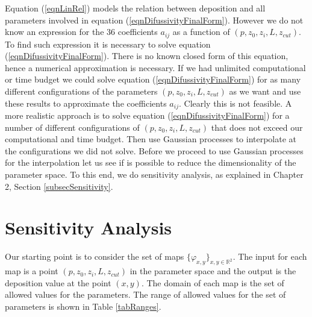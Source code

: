 \documentclass[12pt]{book}
\begin{document}
Equation (\ref{eqnLinRel}) models the relation between deposition and all
parameters involved in equation (\ref{eqnDifussivityFinalForm}). However we do not 
know an expression for the 36 coefficients $a_{ij}$ as a function of
$(p,z_{0},z_{i},L,z_{cut})$. To find such expression it is necessary
to solve equation (\ref{eqnDifussivityFinalForm}). There is no known closed
form of this equation, hence a numerical approximation is necessary. If we
had unlimited computational or time budget we could solve equation 
(\ref{eqnDifussivityFinalForm}) for as many different configurations
of the parameters $(p,z_{0},z_{i},L,z_{cut})$ as we want and use these
results to approximate the coefficients $a_{ij}$. Clearly this 
is not feasible. A more realistic approach is to solve equation (\ref{eqnDifussivityFinalForm})
for a number of different configurations of $(p,z_{0},z_{i},L,z_{cut})$ that does not
exceed our computational and time budget. Then use Gaussian processes
to interpolate at the configurations we did not solve. Before we proceed to
use Gaussian processes for the interpolation let us see if is possible
to reduce the dimensionality of the parameter space. 
To this end, we do  sensitivity analysis, as explained in Chapter 2, Section \ref{subsecSensitivity}.


\section{Sensitivity Analysis}
Our starting point is to consider the set of  maps $\{\varphi_{x,y}\}_{x,y\in\mathbb{R}^{2}}$. The input
for each map is a point $(p,z_{0},z_{i},L,z_{cut})$ in the parameter space
and the output is the deposition value at the point $(x,y)$. The domain
of each map is the set of allowed values for the parameters. The
range of allowed values for the set of parameters is shown in Table  \ref{tabRanges}\cite{seinfeld1998atmospheric}.
\end{document}
